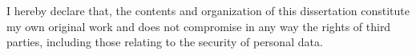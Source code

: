 \begin{declaration}

I hereby declare that, the contents and organization of this dissertation constitute my own original work and does not compromise in any way the rights of third parties, including those relating to the security of personal data.


\end{declaration}

